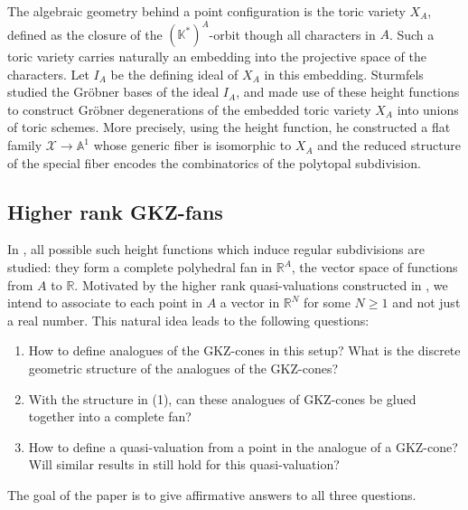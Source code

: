 \documentclass[12pt, a4article]{amsart}   	%
\numberwithin{equation}{section}
\theoremstyle{plain}
\theoremstyle{definition}
\begin{document}
The algebraic geometry behind a point configuration is the toric variety $X_A$, defined as the closure of the $(\mathbb{K}^*)^A$-orbit though all characters in $A$. Such a toric variety carries naturally an embedding into the projective space of the characters. Let $I_A$ be the defining ideal of $X_A$ in this embedding. Sturmfels \cite{StuToric} studied the Gr\"obner bases of the ideal $I_A$, and made use of these height functions to construct Gr\"obner degenerations of the embedded toric variety $X_A$ into  unions of toric schemes. More precisely, using the height function, he constructed a flat family $\mathcal{X}\to\mathbb{A}^1$ whose generic fiber is isomorphic to $X_A$ and the reduced structure of the special fiber encodes the combinatorics of the polytopal subdivision.

\subsection{Higher rank GKZ-fans}

In \cite{GKZ}, all possible such height functions which induce regular subdivisions are studied: they form a complete polyhedral fan in $\mathbb{R}^A$, the vector space of functions from $A$ to $\mathbb{R}$. Motivated by the higher rank quasi-valuations constructed in \cite{CCFL}, we intend to associate to each point in $A$ a vector in $\mathbb{R}^N$ for some $N\geq 1$ and not just a real number. This natural idea leads to the following questions:

\begin{enumerate}
\item[(1)] How to define analogues of the GKZ-cones in this setup? What is the discrete geometric structure of the analogues of the GKZ-cones?
\item[(2)] With the structure in (1), can these analogues of GKZ-cones be glued together into a complete fan?
\item[(3)] How to define a quasi-valuation from a point in the analogue of a GKZ-cone? Will similar results in \cite{CCFL} still hold for this quasi-valuation?
\end{enumerate}

The goal of the paper is to give affirmative answers to all three questions.
\end{document}
